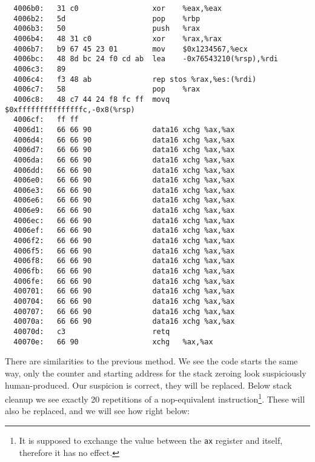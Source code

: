 \documentclass[a4paper,10pt,openright]{memoir}
\newcommand{\code}[1]{\texttt{#1}}
\begin{document}
\begin{verbatim}
  4006b0:   31 c0                 xor    %eax,%eax
  4006b2:   5d                    pop    %rbp
  4006b3:   50                    push   %rax
  4006b4:   48 31 c0              xor    %rax,%rax
  4006b7:   b9 67 45 23 01        mov    $0x1234567,%ecx
  4006bc:   48 8d bc 24 f0 cd ab  lea    -0x76543210(%rsp),%rdi
  4006c3:   89 
  4006c4:   f3 48 ab              rep stos %rax,%es:(%rdi)
  4006c7:   58                    pop    %rax
  4006c8:   48 c7 44 24 f8 fc ff  movq   $0xfffffffffffffffc,-0x8(%rsp)
  4006cf:   ff ff 
  4006d1:   66 66 90              data16 xchg %ax,%ax
  4006d4:   66 66 90              data16 xchg %ax,%ax
  4006d7:   66 66 90              data16 xchg %ax,%ax
  4006da:   66 66 90              data16 xchg %ax,%ax
  4006dd:   66 66 90              data16 xchg %ax,%ax
  4006e0:   66 66 90              data16 xchg %ax,%ax
  4006e3:   66 66 90              data16 xchg %ax,%ax
  4006e6:   66 66 90              data16 xchg %ax,%ax
  4006e9:   66 66 90              data16 xchg %ax,%ax
  4006ec:   66 66 90              data16 xchg %ax,%ax
  4006ef:   66 66 90              data16 xchg %ax,%ax
  4006f2:   66 66 90              data16 xchg %ax,%ax
  4006f5:   66 66 90              data16 xchg %ax,%ax
  4006f8:   66 66 90              data16 xchg %ax,%ax
  4006fb:   66 66 90              data16 xchg %ax,%ax
  4006fe:   66 66 90              data16 xchg %ax,%ax
  400701:   66 66 90              data16 xchg %ax,%ax
  400704:   66 66 90              data16 xchg %ax,%ax
  400707:   66 66 90              data16 xchg %ax,%ax
  40070a:   66 66 90              data16 xchg %ax,%ax
  40070d:   c3                    retq   
  40070e:   66 90                 xchg   %ax,%ax
\end{verbatim}

There are similarities to the previous method. We see the code starts 
the same way, only the counter and starting address for the stack 
zeroing look suspiciously human-produced. Our suspicion is correct, 
they will be replaced. Below stack cleanup we see exactly 20 
repetitions of a nop-equivalent instruction\footnote{It is supposed to 
exchange the value between the \code{ax} register and itself, therefore 
it has no effect.}. These will also be replaced, and we will see how right 
below:
\end{document}
